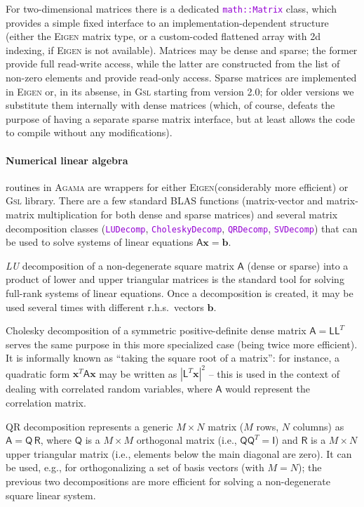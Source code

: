 \documentclass[12pt]{article}
\newcommand{\Agama}{\textsc{Agama}\xspace}
\newcommand{\Gsl}  {\textsc{Gsl}\xspace}
\newcommand{\Eigen}{\textsc{Eigen}\xspace}
\newcommand{\ttt}[1]{\textcolor{darkviolet}{\texttt{#1}}}
\newcommand{\bx}{\boldsymbol{x}}
\let\oldparagraph\paragraph
\renewcommand{\paragraph}[1]{\vspace{-2mm}\oldparagraph{#1}}
\begin{document}
For two-dimensional matrices there is a dedicated \ttt{math::Matrix} class, which provides a simple fixed interface to an implementation-dependent structure (either the \Eigen matrix type, or a custom-coded flattened array with 2d indexing, if \Eigen is not available).
Matrices may be dense and sparse; the former provide full read-write access, while the latter are constructed from the list of non-zero elements and provide read-only access. Sparse matrices are implemented in \Eigen or, in its absense, in \Gsl starting from version 2.0; for older versions we substitute them internally with dense matrices (which, of course, defeats the purpose of having a separate sparse matrix interface, but at least allows the code to compile without any modifications).

\paragraph{Numerical linear algebra}  routines in \Agama are wrappers for either \Eigen (considerably more efficient) or \Gsl library.
There are a few standard BLAS functions (matrix-vector and matrix-matrix multiplication for both dense and sparse matrices) and several matrix decomposition classes (\ttt{LUDecomp}, \ttt{CholeskyDecomp}, \ttt{QRDecomp}, \ttt{SVDecomp}) that can be used to solve systems of linear equations $\mathsf{A}\bx=\boldsymbol{b}$.

\textsl{LU} decomposition of a non-degenerate square matrix $\mathsf{A}$ (dense or sparse) into a product of lower and upper triangular matrices is the standard tool for solving full-rank systems of linear equations. Once a decomposition is created, it may be used several times with different r.h.s.\ vectors $\boldsymbol{b}$.

Cholesky decomposition of a symmetric positive-definite dense matrix $\mathsf{A} = \mathsf{L}\mathsf{L}^T$ serves the same purpose in this more specialized case (being twice more efficient). It is informally known as ``taking the square root of a matrix'': for instance, a quadratic form $\bx^T \mathsf{A} \bx$ may be written as $|\mathsf{L}^T\bx|^2$ -- this is used in the context of dealing with correlated random variables, where $\mathsf{A}$ would represent the correlation matrix.

\textsc{QR} decomposition represents a generic $M\times N$ matrix ($M$ rows, $N$ columns) as $\mathsf{A} = \mathsf{Q}\,\mathsf{R}$, where $\mathsf{Q}$ is a $M\times M$ orthogonal matrix (i.e., $\mathsf{Q}\mathsf{Q}^T=\mathsf{I}$) and $\mathsf{R}$ is a $M\times N$ upper triangular matrix (i.e., elements below the main diagonal are zero). It can be used, e.g., for orthogonalizing a set of basis vectors (with $M=N$); the previous two decompositions are more efficient for solving a non-degenerate square linear system.
\end{document}
